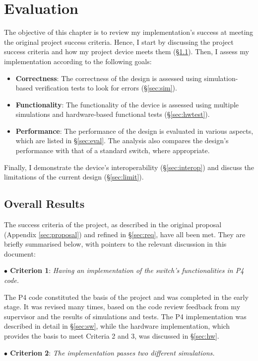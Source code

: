 \chapter{Evaluation}
The objective of this chapter is to review my implementation's success at meeting the original project success criteria. Hence, I start by discussing the project success criteria and how my project device meets them (\S\ref{sec:results}). Then, I assess my implementation according to the following goals:
\begin{itemize}[leftmargin=*, noitemsep]
	\item \textbf{Correctness}: The correctness of the design is assessed using simulation-based verification tests to look for errors (\S\ref{sec:sim}).
	\item \textbf{Functionality}: The functionality of the device is assessed using multiple simulations and hardware-based functional tests (\S\ref{sec:hwtest}).
	\item \textbf{Performance}: The performance of the design is evaluated in various aspects, which are listed in \S\ref{sec:eval}. The analysis also compares the design's performance with that of a standard switch, where appropriate.
\end{itemize}
Finally, I demonstrate the device's interoperability (\S\ref{sec:interop}) and discuss the limitations of the current design (\S\ref{sec:limit}). 

\section{Overall Results}
\label{sec:results}
The success criteria of the project, as described in the original proposal (Appendix \ref{sec:proposal}) and refined in \S\ref{sec:req}, have all been met. They are briefly summarised below, with pointers to the relevant discussion in this document:

\textbf{$\bullet$ Criterion 1}: \textit{Having an implementation of the switch's functionalities in P4 code.}

The P4 code constituted the basis of the project and was completed in the early stage. It was revised many times, based on the code review feedback from my supervisor and the results of simulations and tests. The P4 implementation was described in detail in \S\ref{sec:sw}, while the hardware implementation, which provides the basis to meet Criteria 2 and 3, was discussed in \S\ref{sec:hw}.

\textbf{$\bullet$ Criterion 2}: \textit{The implementation passes two different simulations.}


